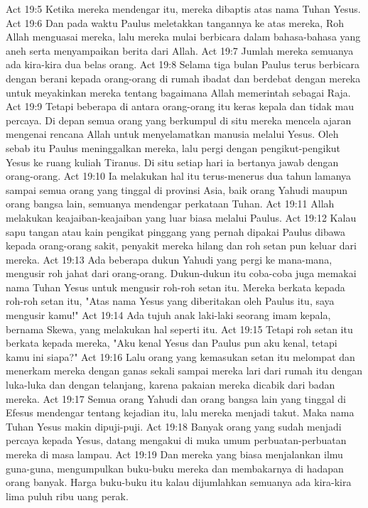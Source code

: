 Act 19:5  Ketika mereka mendengar itu, mereka dibaptis atas nama Tuhan Yesus.
Act 19:6  Dan pada waktu Paulus meletakkan tangannya ke atas mereka, Roh Allah menguasai mereka, lalu mereka mulai berbicara dalam bahasa-bahasa yang aneh serta menyampaikan berita dari Allah.
Act 19:7  Jumlah mereka semuanya ada kira-kira dua belas orang.
Act 19:8  Selama tiga bulan Paulus terus berbicara dengan berani kepada orang-orang di rumah ibadat dan berdebat dengan mereka untuk meyakinkan mereka tentang bagaimana Allah memerintah sebagai Raja.
Act 19:9  Tetapi beberapa di antara orang-orang itu keras kepala dan tidak mau percaya. Di depan semua orang yang berkumpul di situ mereka mencela ajaran mengenai rencana Allah untuk menyelamatkan manusia melalui Yesus. Oleh sebab itu Paulus meninggalkan mereka, lalu pergi dengan pengikut-pengikut Yesus ke ruang kuliah Tiranus. Di situ setiap hari ia bertanya jawab dengan orang-orang.
Act 19:10  Ia melakukan hal itu terus-menerus dua tahun lamanya sampai semua orang yang tinggal di provinsi Asia, baik orang Yahudi maupun orang bangsa lain, semuanya mendengar perkataan Tuhan.
Act 19:11  Allah melakukan keajaiban-keajaiban yang luar biasa melalui Paulus.
Act 19:12  Kalau sapu tangan atau kain pengikat pinggang yang pernah dipakai Paulus dibawa kepada orang-orang sakit, penyakit mereka hilang dan roh setan pun keluar dari mereka.
Act 19:13  Ada beberapa dukun Yahudi yang pergi ke mana-mana, mengusir roh jahat dari orang-orang. Dukun-dukun itu coba-coba juga memakai nama Tuhan Yesus untuk mengusir roh-roh setan itu. Mereka berkata kepada roh-roh setan itu, "Atas nama Yesus yang diberitakan oleh Paulus itu, saya mengusir kamu!"
Act 19:14  Ada tujuh anak laki-laki seorang imam kepala, bernama Skewa, yang melakukan hal seperti itu.
Act 19:15  Tetapi roh setan itu berkata kepada mereka, "Aku kenal Yesus dan Paulus pun aku kenal, tetapi kamu ini siapa?"
Act 19:16  Lalu orang yang kemasukan setan itu melompat dan menerkam mereka dengan ganas sekali sampai mereka lari dari rumah itu dengan luka-luka dan dengan telanjang, karena pakaian mereka dicabik dari badan mereka.
Act 19:17  Semua orang Yahudi dan orang bangsa lain yang tinggal di Efesus mendengar tentang kejadian itu, lalu mereka menjadi takut. Maka nama Tuhan Yesus makin dipuji-puji.
Act 19:18  Banyak orang yang sudah menjadi percaya kepada Yesus, datang mengakui di muka umum perbuatan-perbuatan mereka di masa lampau.
Act 19:19  Dan mereka yang biasa menjalankan ilmu guna-guna, mengumpulkan buku-buku mereka dan membakarnya di hadapan orang banyak. Harga buku-buku itu kalau dijumlahkan semuanya ada kira-kira lima puluh ribu uang perak.
